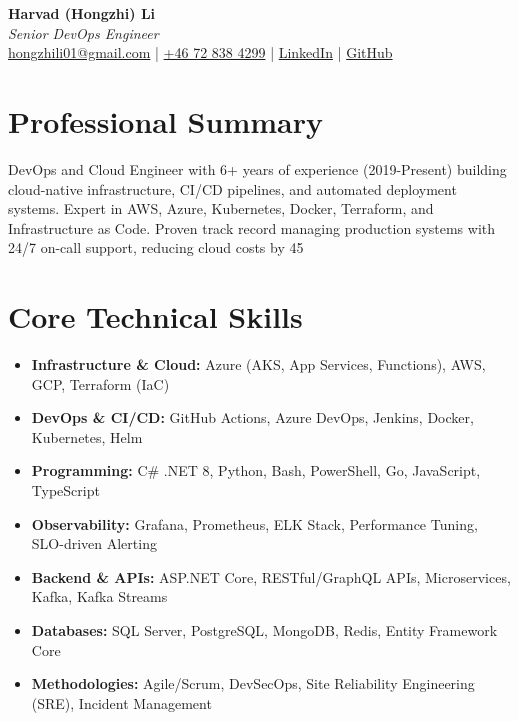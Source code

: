 \documentclass[11pt,a4paper]{article}
\begin{document}
\begin{center}
{\LARGE \textbf{Harvad (Hongzhi) Li}}\\[10pt]
{\Large \textit{Senior DevOps Engineer}}\\[10pt]
\textcolor{titlecolor}{\href{mailto:hongzhili01@gmail.com}{hongzhili01@gmail.com} | \href{tel:+46728384299}{+46 72 838 4299} | \href{https://www.linkedin.com/in/harvad/}{LinkedIn} | \href{https://github.com/bluehawana}{GitHub}}
\end{center}

\vspace{8pt}

\section*{Professional Summary}
DevOps and Cloud Engineer with 6+ years of experience (2019-Present) building cloud-native infrastructure, CI/CD pipelines, and automated deployment systems. Expert in AWS, Azure, Kubernetes, Docker, Terraform, and Infrastructure as Code. Proven track record managing production systems with 24/7 on-call support, reducing cloud costs by 45%

\section*{Core Technical Skills}
\begin{itemize}[noitemsep]
\item \textbf{Infrastructure \& Cloud:} Azure (AKS, App Services, Functions), AWS, GCP, Terraform (IaC)
\item \textbf{DevOps \& CI/CD:} GitHub Actions, Azure DevOps, Jenkins, Docker, Kubernetes, Helm
\item \textbf{Programming:} C\# .NET 8, Python, Bash, PowerShell, Go, JavaScript, TypeScript
\item \textbf{Observability:} Grafana, Prometheus, ELK Stack, Performance Tuning, SLO-driven Alerting
\item \textbf{Backend \& APIs:} ASP.NET Core, RESTful/GraphQL APIs, Microservices, Kafka, Kafka Streams
\item \textbf{Databases:} SQL Server, PostgreSQL, MongoDB, Redis, Entity Framework Core
\item \textbf{Methodologies:} Agile/Scrum, DevSecOps, Site Reliability Engineering (SRE), Incident Management
\end{itemize}
\end{document}
